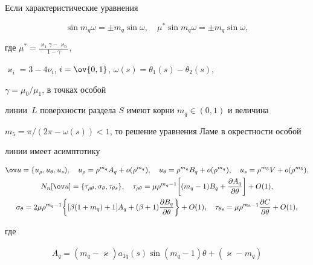 \begin{lem} 


Если характеристические уравнения 


\begin{equation} 


\sin m_q\omega=\pm m_q\sin\omega,\quad 


\mu^*\sin m_q\omega=\pm m_q\sin\omega, 


\end{equation} 


где $\mu^*=\frac{\varkappa_1\gamma-\varkappa_0}{1-\gamma}$, 


$\varkappa_i=3-4\nu_i$, $i=\ov{0,1}$, $\omega(s)=\theta_1(s)-\theta_2(s)$, 


$\gamma=\mu_0/\mu_1$, в точках особой  


линии~$L$ поверхности раздела $S$ имеют корни $m_q\in(0,1)$ и величина  


$m_5=\pi/(2\pi-\omega(s))<1$, то решение уравнения Ламе в окрестности особой 


линии  имеет асимптотику 


\begin{gather} 


\ov u=\{u_\rho,u_\theta,u_s),\quad u_\rho=\rho^{m_q}A_q+ 


o(\rho^{m_q}),\quad u_\theta=\rho^{m_q}B_q+o(\rho^{m_q}),\quad 


u_s=\rho^{m_5}V+o(\rho^{m_5}),\notag \\ 


% 


N_n[\ov u]=\{\tau_{\rho\theta},\sigma_\theta,\tau_{\theta s}\},\quad 


\tau_{\rho\theta}=\mu\rho^{m_q-1}\bigg[(m_q-1)B_q+ 


\frac{\partial A_q}{\partial\theta}\bigg]+O(1),\notag \\ 


% 


\sigma_\theta=2\mu\rho^{m_q-1}\bigg\{[\beta(1+m_q)+1]A_q+(\beta+1) 


\frac{\partial B_q}{\partial\theta}\bigg\}+O(1),\quad \tau_{\theta s}= 


\mu\rho^{m_5-1}\frac{\partial C}{\partial\theta}+O(1), 


\end{gather} 


где  


\begin{gather} 


A_q=(m_q-\varkappa)a_{1q}(s)\sin(m_q-1)\theta+(\varkappa-m_q) 



\end{gather}
\end{lem}
